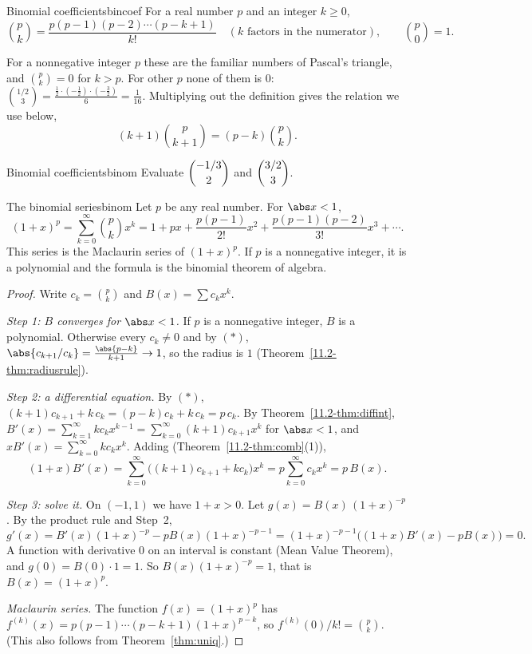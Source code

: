 \documentclass[11pt]{article}
\begin{document}
\begin{defn}{Binomial coefficients}{bincoef}
For a real number $p$ and an integer $k\ge0$,
\[
\binom pk=\frac{p(p-1)(p-2)\cdots(p-k+1)}{k!}\quad(k\text{ factors in the numerator}),\qquad\binom p0=1 .
\]
\end{defn}

For a nonnegative integer $p$ these are the familiar numbers of Pascal's triangle, and $\binom pk=0$ for $k>p$. For other $p$ none of them is $0$: $\binom{1/2}3=\frac{\frac12\cdot(-\frac12)\cdot(-\frac32)}{6}=\frac1{16}$. Multiplying out the definition gives the relation we use below,
\[
(k+1)\binom p{k+1}=(p-k)\binom pk .\tag{$\ast$}
\]

\begin{kc}{Binomial coefficients}{binom}
Evaluate $\dbinom{-1/3}2$ and $\dbinom{3/2}3$.
\end{kc}

\begin{thm}{The binomial series}{binom}
Let $p$ be any real number. For $\abs x<1$,
\[
(1+x)^p=\sum_{k=0}^\infty\binom pkx^k=1+px+\frac{p(p-1)}{2!}x^2+\frac{p(p-1)(p-2)}{3!}x^3+\cdots .
\]
This series is the Maclaurin series of $(1+x)^p$. If $p$ is a nonnegative integer, it is a polynomial and the formula is the binomial theorem of algebra.
\end{thm}
\begin{proof}
Write $c_k=\binom pk$ and $B(x)=\sum c_kx^k$.

\emph{Step 1: $B$ converges for $\abs x<1$.} If $p$ is a nonnegative integer, $B$ is a polynomial. Otherwise every $c_k\ne0$ and by $(\ast)$, $\abs{c_{k+1}/c_k}=\frac{\abs{p-k}}{k+1}\to1$, so the radius is $1$ (Theorem~\ref{11.2-thm:radiusrule}).

\emph{Step 2: a differential equation.} By $(\ast)$, $(k+1)c_{k+1}+k\,c_k=(p-k)c_k+k\,c_k=p\,c_k$. By Theorem~\ref{11.2-thm:diffint}, $B'(x)=\sum_{k=1}^\infty kc_kx^{k-1}=\sum_{k=0}^\infty(k+1)c_{k+1}x^k$ for $\abs x<1$, and $xB'(x)=\sum_{k=0}^\infty kc_kx^k$. Adding (Theorem~\ref{11.2-thm:comb}(1)),
\[
(1+x)B'(x)=\sum_{k=0}^\infty\bigl((k+1)c_{k+1}+kc_k\bigr)x^k=p\sum_{k=0}^\infty c_kx^k=p\,B(x).
\]

\emph{Step 3: solve it.} On $(-1,1)$ we have $1+x>0$. Let $g(x)=B(x)\,(1+x)^{-p}$. By the product rule and Step~2,
\[
g'(x)=B'(x)(1+x)^{-p}-pB(x)(1+x)^{-p-1}=(1+x)^{-p-1}\bigl((1+x)B'(x)-pB(x)\bigr)=0 .
\]
A function with derivative $0$ on an interval is constant (Mean Value Theorem), and $g(0)=B(0)\cdot1=1$. So $B(x)(1+x)^{-p}=1$, that is $B(x)=(1+x)^p$.

\emph{Maclaurin series.} The function $f(x)=(1+x)^p$ has $f^{(k)}(x)=p(p-1)\cdots(p-k+1)(1+x)^{p-k}$, so $f^{(k)}(0)/k!=\binom pk$. (This also follows from Theorem~\ref{thm:uniq}.)
\end{proof}
\end{document}
